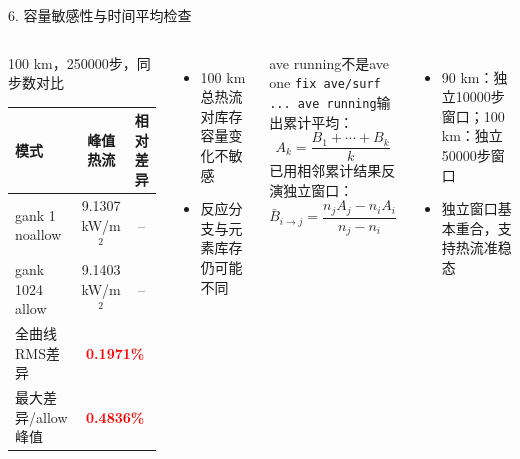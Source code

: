 \documentclass[aspectratio=169,11pt]{ctexbeamer}
\newcommand{\keynum}[1]{\textcolor{red}{\bfseries #1}}
\begin{document}
\begin{frame}{6. 容量敏感性与时间平均检查}
  \footnotesize
  \begin{columns}[T,totalwidth=\textwidth]
    \begin{block}{100 km，250000步，同步数对比}
      \begin{tabular}{lcc}
        \toprule
        模式 & 峰值热流 & 相对差异 \\
        \midrule
        gank 1 noallow & 9.1307 kW/m$^2$ & -- \\
        gank 1024 allow & 9.1403 kW/m$^2$ & -- \\
        \midrule
        全曲线RMS差异 & \multicolumn{2}{c}{\keynum{0.1971\%}} \\
        最大差异/allow峰值 & \multicolumn{2}{c}{\keynum{0.4836\%}} \\
        \bottomrule
      \end{tabular}
    \end{block}
    \begin{itemize}
      \item 100 km总热流对库存容量变化不敏感
      \item 反应分支与元素库存仍可能不同
    \end{itemize}
    \begin{block}{ave running不是ave one}
      \texttt{fix ave/surf ... ave running}输出累计平均：
      \[
        A_k=\frac{B_1+\cdots+B_k}{k}
      \]
      已用相邻累计结果反演独立窗口：
      \[
        \bar B_{i\rightarrow j}=\frac{n_jA_j-n_iA_i}{n_j-n_i}
      \]
    \end{block}
    \begin{itemize}
      \item 90 km：独立10000步窗口；100 km：独立50000步窗口
      \item 独立窗口基本重合，支持热流准稳态
    \end{itemize}
  \end{columns}
\end{frame}
\end{document}
